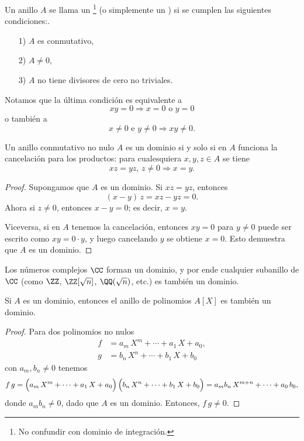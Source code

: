 \begin{definicion}
  Un anillo $A$ se llama un \footnote{No confundir
    con dominio de integración.} (o simplemente un ) si se cumplen
  las siguientes condiciones:.

  \begin{enumerate}
  \item[1)] $A$ es conmutativo,

  \item[2)] $A\ne 0$,

  \item[3)] $A$ no tiene divisores de cero no triviales.
  \end{enumerate}
\end{definicion}

Notamos que la última condición es equivalente a
$$xy = 0 \Longrightarrow x = 0\text{ o }y = 0$$
o también a
$$x\ne 0 \text{ e } y\ne 0 \Longrightarrow xy \ne 0.$$

\begin{observacion}
  Un anillo conmutativo no nulo $A$ es un dominio si y solo si en $A$ funciona
  la cancelación para los productos: para cualesquiera $x,y,z\in A$ se tiene
  $$xz = yz, \, z \ne 0 \Longrightarrow x = y.$$

  \begin{proof}
    Supongamos que $A$ es un dominio. Si $xz = yz$, entonces
    $$(x-y)\,z = xz - yz = 0.$$
    Ahora si $z \ne 0$, entonces $x-y = 0$; es decir, $x = y$.

    Viceversa, si en $A$ tenemos la cancelación, entonces $xy = 0$ para
    $y \ne 0$ puede ser escrito como $xy = 0\cdot y$, y luego cancelando $y$ se
    obtiene $x = 0$. Esto demuestra que $A$ es un dominio.
  \end{proof}
\end{observacion}

\begin{ejemplo}
  Los números complejos $\CC$ forman un dominio, y por ende cualquier subanillo
  de $\CC$ (como $\ZZ$, $\ZZ [\sqrt{n}]$, $\QQ (\sqrt{n})$, etc.) es también
  un dominio.
\end{ejemplo}

\begin{proposicion}
  \label{prop:A-dominio-AX-dominio}
  Si $A$ es un dominio, entonces el anillo de polinomios $A [X]$ es también un
  dominio.

  \begin{proof}
    Para dos polinomios no nulos
    \begin{align*}
      f & = a_m\,X^m + \cdots + a_1\,X + a_0,\\
      g & = b_n\,X^n + \cdots + b_1\,X + b_0
    \end{align*}
    con $a_m, b_n \ne 0$ tenemos
    \[ f \, g =
      \Bigl(a_m\,X^m + \cdots + a_1\,X + a_0\Bigr)\,\Bigl(b_n\,X^n + \cdots + b_1\,X + b_0\Bigr) =
      a_m b_n \, X^{m+n} + \cdots + a_0\,b_0, \]
    donde $a_m b_n \ne 0$, dado que $A$ es un dominio. Entonces, $f \, g \ne 0$.
  \end{proof}
\end{proposicion}

